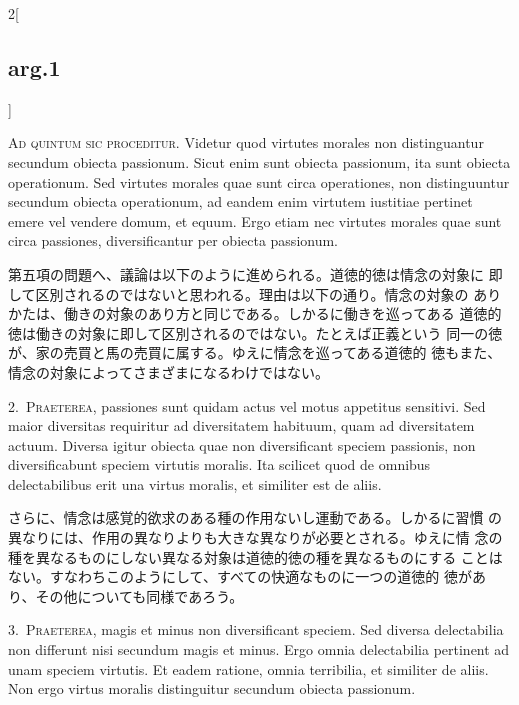 \documentclass[paper=a4paper,fontsize=10pt,jafontsize=9pt,titlepage]{jlreq}
\begin{document}
\begin{paracol}{2}[\subsection{arg.1}]

{\scshape Ad quintum sic proceditur}. Videtur quod virtutes morales
 non distinguantur secundum obiecta passionum. Sicut enim sunt obiecta
 passionum, ita sunt obiecta operationum. Sed virtutes morales quae
 sunt circa operationes, non distinguuntur secundum obiecta
 operationum, ad eandem enim virtutem iustitiae pertinet emere vel
 vendere domum, et equum. Ergo etiam nec virtutes morales quae sunt
 circa passiones, diversificantur per obiecta passionum.

\switchcolumn

第五項の問題へ、議論は以下のように進められる。道徳的徳は情念の対象に
 即して区別されるのではないと思われる。理由は以下の通り。情念の対象の
 ありかたは、働きの対象のあり方と同じである。しかるに働きを巡ってある
 道徳的徳は働きの対象に即して区別されるのではない。たとえば正義という
 同一の徳が、家の売買と馬の売買に属する。ゆえに情念を巡ってある道徳的
 徳もまた、情念の対象によってさまざまになるわけではない。


2.~{\scshape Praeterea}, passiones sunt quidam actus vel motus
appetitus sensitivi. Sed maior diversitas requiritur ad diversitatem
habituum, quam ad diversitatem actuum. Diversa igitur obiecta quae non
diversificant speciem passionis, non diversificabunt speciem virtutis
moralis. Ita scilicet quod de omnibus delectabilibus erit una virtus
moralis, et similiter est de aliis.

\switchcolumn

さらに、情念は感覚的欲求のある種の作用ないし運動である。しかるに習慣
 の異なりには、作用の異なりよりも大きな異なりが必要とされる。ゆえに情
 念の種を異なるものにしない異なる対象は道徳的徳の種を異なるものにする
 ことはない。すなわちこのようにして、すべての快適なものに一つの道徳的
 徳があり、その他についても同様であろう。


3.~{\scshape Praeterea}, magis et minus non diversificant speciem. Sed
diversa delectabilia non differunt nisi secundum magis et minus. Ergo
omnia delectabilia pertinent ad unam speciem virtutis. Et eadem
ratione, omnia terribilia, et similiter de aliis. Non ergo virtus
moralis distinguitur secundum obiecta passionum.


\end{paracol}
\end{document}

